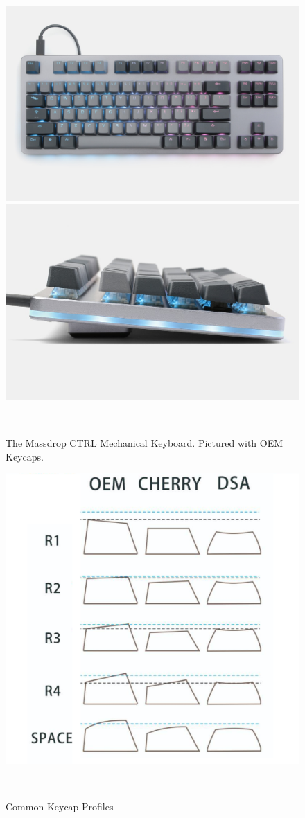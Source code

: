 \documentclass{sigchi}
\begin{document}
\begin{figure}
\centering
  \includegraphics[width=0.9\columnwidth]{figures/ctrl_top_view}
  \includegraphics[width=0.9\columnwidth]{figures/ctrl_side_view}
  \caption{The Massdrop CTRL Mechanical Keyboard. Pictured with OEM Keycaps. }~\label{fig:ctrl_top_view}
\end{figure}
\begin{figure}
\centering
  \includegraphics[width=0.9\columnwidth]{figures/oem_cherry_dsa}
  \caption{Common Keycap Profiles}~\label{fig:oem_cherry_dsa}
\end{figure}
\end{document}

